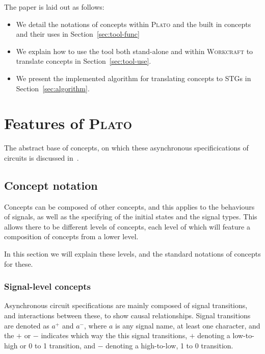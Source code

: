 \documentclass[british,conference,compsoc]{IEEEtran}
\newcommand{\noun}[1]{\textsc{#1}}
\begin{document}
The paper is laid out as follows:
\vspace{-6mm}
\begin{itemize}
  \item We detail the notations of concepts within \noun{Plato} and the built in
  concepts and their uses in Section~\ref{sec:tool-func}
  \item We explain how to use the tool both stand-alone and within
  \noun{Workcraft} to translate concepts in Section~\ref{sec:tool-use}.
  \item We present the implemented algorithm for translating concepts to STGs
  in Section~\ref{sec:algorithm}.
\end{itemize}

\section{Features of \noun{Plato}\label{sec:tool-func}}

\vspace{-3mm}

The abstract base of concepts, on which these asynchronous specificications of 
circuits is discussed in~\cite{2015_Beaumont_MEMOCODE}.

\vspace{-3mm}

\subsection{Concept notation \label{sub:concept-notation}}

\vspace{-3mm}

Concepts can be composed of other concepts, and this applies to the behaviours 
of signals, as well as the specifying of the initial states and the signal 
types. This allows there to be different levels of concepts, each level of 
which will feature a composition of concepts from a lower level. 

In this section we will explain these levels, and the standard notations of 
concepts for these. 

\vspace{-2mm}

\subsubsection{\label{signal-level}Signal-level concepts}Asynchronous circuit 
specifications are mainly composed of signal transitions, and interactions 
between these, to show causal relationships. Signal transitions are denoted as 
$a^{+}$ and $a^{-}$, where $a$ is any signal name, at least one character, and 
the $+$ or $-$ indicates which way the this signal transitions, $+$ denoting a 
low-to-high or 0 to 1 transition, and $-$ denoting a high-to-low, 1 to 0 
transition. 
\end{document}
